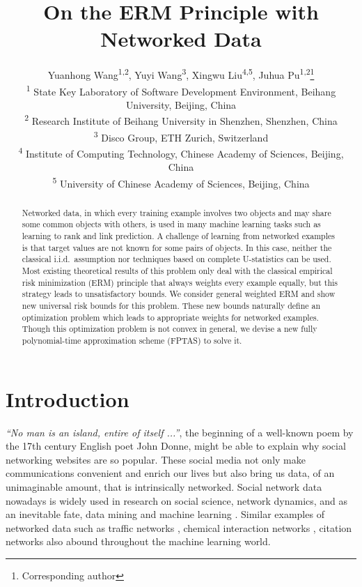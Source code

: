 \documentclass[letterpaper]{article} %
\title{On the ERM Principle with Networked Data}
\author{Yuanhong Wang\textsuperscript{1,2}, Yuyi Wang\textsuperscript{3}, Xingwu Liu\textsuperscript{4,5}, Juhua Pu\textsuperscript{1,2}\thanks{Corresponding author}\\
\textsuperscript{1} State Key Laboratory of Software Development Environment, Beihang University, Beijing, China\\
\textsuperscript{2} Research Institute of Beihang University in Shenzhen, Shenzhen, China\\
\textsuperscript{3} Disco Group, ETH Zurich, Switzerland\\
\textsuperscript{4} Institute of Computing Technology, Chinese Academy of Sciences, Beijing, China\\
\textsuperscript{5} University of Chinese Academy of Sciences, Beijing, China
}
\newcommand{\red}[1]{\textcolor{red}{#1}}
\newcommand{\todo}[1]{\red{\textsc{todo:} #1}}
\begin{document}
\maketitle

\begin{abstract}
Networked data, in which every training example involves two objects and may share some common objects with others, is used in many machine learning tasks such as learning to rank and link prediction. 
A challenge of learning from networked examples is that target values are not known for some pairs of objects. 
In this case, neither the classical i.i.d.\ assumption nor techniques based on complete U-statistics can be used. 
Most existing theoretical results of this problem only deal with the classical empirical risk minimization (ERM) principle that always weights every example equally, 
but this strategy leads to unsatisfactory bounds. 
We consider general weighted ERM and show new universal risk bounds for this problem. 
These new bounds naturally define an optimization problem which leads to appropriate weights for networked examples. 
Though this optimization problem is not convex in general, we devise a new fully polynomial-time approximation scheme (FPTAS) to solve it. 
\end{abstract}

\section{Introduction}
\label{sec:introduction}
\textit{``No man is an island, entire of itself ...''}, the beginning of a well-known poem by the 17th century English poet John Donne, might be able to explain why social networking websites are so popular. 
These social media not only make communications convenient and enrich our lives but also bring us data, of an unimaginable amount, that is intrinsically networked. 
Social network data nowadays is widely used in research on social science, network dynamics, and as an inevitable fate, data mining and machine learning \cite{scott2017social}. 
Similar examples of networked data such as traffic networks \cite{min2011real}, chemical interaction networks \cite{szklarczyk2014string}, citation networks \cite{dawson2014current} also abound throughout the machine learning world. 

\end{document}

